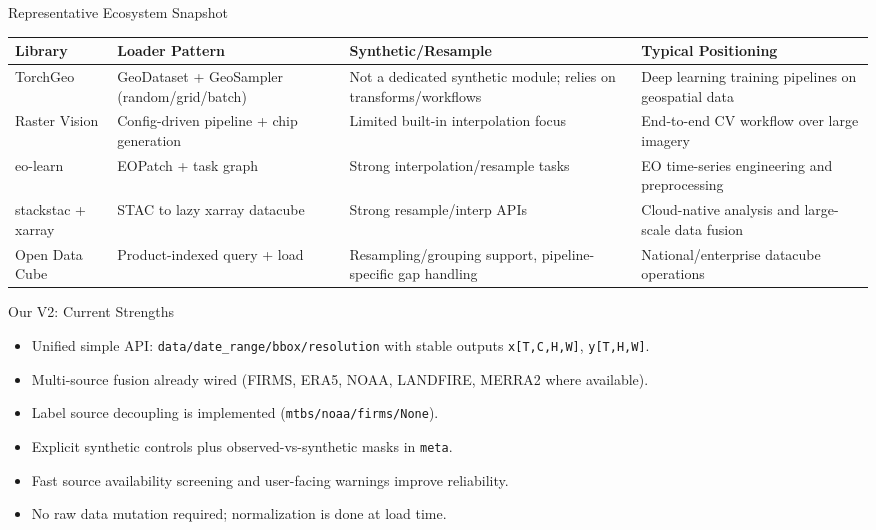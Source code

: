 \documentclass{beamer}
\begin{document}
\begin{frame}{Representative Ecosystem Snapshot}
\small
\begin{tabular}{>{\raggedright\arraybackslash}p{2.2cm} >{\raggedright\arraybackslash}p{2.5cm} >{\raggedright\arraybackslash}p{2.5cm} >{\raggedright\arraybackslash}p{2.8cm}}
\toprule
Library & Loader Pattern & Synthetic/Resample & Typical Positioning \\
\midrule
TorchGeo & GeoDataset + GeoSampler (random/grid/batch) & Not a dedicated synthetic module; relies on transforms/workflows & Deep learning training pipelines on geospatial data \\
\midrule
Raster Vision & Config-driven pipeline + chip generation & Limited built-in interpolation focus & End-to-end CV workflow over large imagery \\
\midrule
eo-learn & EOPatch + task graph & Strong interpolation/resample tasks & EO time-series engineering and preprocessing \\
\midrule
stackstac + xarray & STAC to lazy xarray datacube & Strong resample/interp APIs & Cloud-native analysis and large-scale data fusion \\
\midrule
Open Data Cube & Product-indexed query + load & Resampling/grouping support, pipeline-specific gap handling & National/enterprise datacube operations \\
\bottomrule
\end{tabular}
\end{frame}

\begin{frame}{Our V2: Current Strengths}
\begin{itemize}
  \item Unified simple API: \texttt{data/date\_range/bbox/resolution} with stable outputs \texttt{x[T,C,H,W]}, \texttt{y[T,H,W]}.
  \item Multi-source fusion already wired (FIRMS, ERA5, NOAA, LANDFIRE, MERRA2 where available).
  \item Label source decoupling is implemented (\texttt{mtbs/noaa/firms/None}).
  \item Explicit synthetic controls plus observed-vs-synthetic masks in \texttt{meta}.
  \item Fast source availability screening and user-facing warnings improve reliability.
  \item No raw data mutation required; normalization is done at load time.
\end{itemize}
\end{frame}
\end{document}
